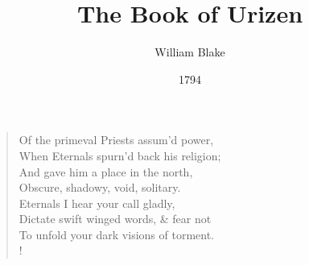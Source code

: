 \documentclass[9pt]{extarticle}
\title{The Book of Urizen}
\author{William Blake}
\date{1794}
\begin{document}
	

\maketitle

\vspace{2cm}
		
		
	\begin{verse}
		\begin{altverse} 
			

		Of the primeval Priests assum'd power,\\
		When Eternals spurn'd back his religion;\\
		And gave him a place in the north,\\
		Obscure, shadowy, void, solitary.\\
		Eternals I hear your call gladly,\\
		Dictate swift winged words, \& fear not\\
		To unfold your dark visions of torment.\\!
		
		\end{altverse}
\end{verse}	
\end{document}
